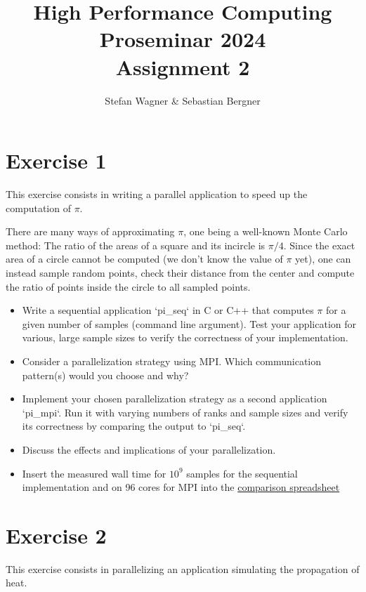 \documentclass[UTF-8]{article}
\title{High Performance Computing Proseminar 2024 \\
    \large Assignment 2} %
\author{Stefan Wagner \& Sebastian Bergner}
\begin{document}
    
    \maketitle
    
    \section*{Exercise 1}
    This exercise consists in writing a parallel application to speed up the computation of $\pi$.
    
    There are many ways of approximating $\pi$, one being a well-known Monte Carlo method: The ratio of the areas of a square and its incircle is $\pi/4$. Since the exact area of a circle cannot be computed (we don't know the value of $\pi$ yet), one can instead sample random points, check their distance from the center and compute the ratio of points inside the circle to all sampled points.
    
    \begin{itemize}
    	\item Write a sequential application `pi\_seq` in C or C++ that computes $\pi$ for a given number of samples (command line argument). Test your application for various, large sample sizes to verify the correctness of your implementation.
    	\item Consider a parallelization strategy using MPI. Which communication pattern(s) would you choose and why?
    	\item Implement your chosen parallelization strategy as a second application `pi\_mpi`. Run it with varying numbers of ranks and sample sizes and verify its correctness by comparing the output to `pi\_seq`.
    	\item Discuss the effects and implications of your parallelization.
    	\item Insert the measured wall time for $10^9$ samples for the sequential implementation and on 96 cores for MPI into the  \href{https://docs.google.com/spreadsheets/d/1p6d9F12EtykmI2-7MnHkg0U15UAtaCvWz8Ip92ZEsWo}{comparison spreadsheet}
    \end{itemize}
    
    
    
    \section*{Exercise 2}
	This exercise consists in parallelizing an application simulating the propagation of heat.
	
\end{document}
